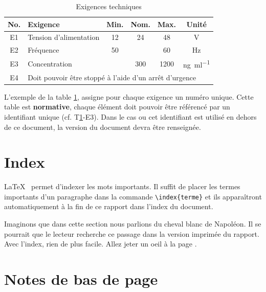 \documentclass[
    iai, %
    eai, %
]{heig-tb}
\begin{document}
\begin{table}[h]
  \begin{center}
    \caption{Exigences techniques \label{specification}}
    \begin{tabularx}{\textwidth}{cXcccc}
      No. & Exigence                                                                   & Min. & Nom. & Max. & Unité                           \\ \toprule
      E1  & Tension d'alimentation                                                     & 12   & 24   & 48   & \si{\volt}                      \\ \midrule
      E2  & Fréquence                                                                  & 50   &      & 60   & \si{\hertz}                     \\ \midrule
      E3  & Concentration                                                              &      & 300  & 1200 & \si{\nano\gram\per\milli\litre} \\ \midrule
      E4  & \multicolumn{5}{l}{Doit pouvoir être stoppé à l'aide d'un arrêt d'urgence}
    \end{tabularx}
  \end{center}
\end{table}

L'exemple de la table \ref{specification}, assigne pour chaque exigence un numéro unique. Cette table est \textbf{normative}, chaque élément doit pouvoir être référencé par un identifiant unique (cf. T\ref{specification}-E3). Dans le cas ou cet identifiant est utilisé en dehors de ce document, la version du document devra être renseignée.

\section{Index}
\LaTeX~ permet d'indexer les mots  importants. Il suffit de placer les termes importants d'un paragraphe dans la commande \texttt{\textbackslash index\{terme\}} et ils apparaîtront automatiquement à la fin de ce rapport dans l'index du document.


Imaginons que dans cette section nous parlions du cheval blanc  de Napoléon. Il se pourrait que le lecteur recherche ce passage dans la version imprimée du rapport. Avec l'index, rien de plus facile. Allez jeter un oeil à la page \pageref{index}.

\section{Notes de bas de page}
\end{document}
